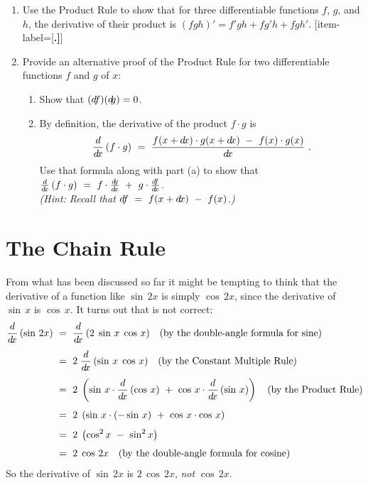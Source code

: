 {\begin{enumerate}[item-label={\bfseries \arabic*.}]
\begin{multicols}{2}
\end{multicols}
[item-label={{[\bfseries \arabic*.]}}]
 \item Use the Product Rule to show that for three differentiable functions $f$,
  $g$, and $h$, the derivative of their product is
  $(fgh)' = f'gh + fg'h + fgh'$.
[item-label={{[\bfseries \arabic*.]}}]
 \item Provide an alternative proof of the Product Rule for two differentiable
 functions $f$ and $g$ of $x$:
 \begin{enumerate}[item-label={\bfseries (\alph*)}]
  \item Show that $(d\negmedspace f)(d\negmedspace g) = 0$.
  \item By definition, the derivative of the product $f \cdot g$ is
   \begin{displaymath}
    \frac{d}{d\!x}\,(f \cdot g) ~=~ \frac{f(x+d\!x) \cdot g(x+d\!x) ~-~ f(x) \cdot g(x)}{d\!x} ~.
   \end{displaymath}
   Use that formula along with part (a) to show that
   $\frac{d}{d\!x}\,(f \cdot g) ~=~ f \cdot \frac{d\negmedspace g}{d\!x} ~+~ g \cdot \frac{d\negmedspace f}{d\!x}$.\\
   \emph{(Hint: Recall that $d\negmedspace f ~=~ f(x+d\!x) ~-~ f(x)$.)}
 \end{enumerate}
\end{enumerate}}
\newpage
\section{The Chain Rule}
From what has been discussed so far it might be tempting to think that the
derivative of a function like $\sin\,2x$ is simply
$\cos\,2x$, since the derivative of $\sin\,x$ is $\cos\,x$.
It turns out that is not correct:
\begin{align*}
 \frac{d}{d\!x}\,(\sin\,2x) ~&=~ \frac{d}{d\!x}\,(2\;\sin\,x\;\cos\,x) \quad\text{(by the double-angle formula for sine)}\\[4pt]
 &=~ 2\;\frac{d}{d\!x}\,(\sin\,x\;\cos\,x) \quad\text{(by the Constant Multiple Rule)}\\[4pt]
 &=~ 2\;\left(\sin\,x \cdot \frac{d}{d\!x}\,(\cos\,x) ~+~ \cos\,x \cdot \frac{d}{d\!x}\,(\sin\,x)\right)
     \quad\text{(by the Product Rule)}\\[4pt]
 &=~ 2\;\left(\sin\,x \cdot (-\sin\,x) ~+~ \cos\,x \cdot \cos\,x\right)\\[4pt]
 &=~ 2\;\left(\cos^2 x ~-~ \sin^2 x\right)\\[4pt]
 &=~ 2\;\cos\,2x \quad\text{(by the double-angle formula for cosine)}
\end{align*}
So the derivative of $\sin\,2x$ is $2\,\cos\,2x$, \emph{not} $\cos\,2x$.

